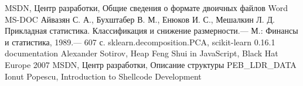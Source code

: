 \begin{thebibliography}{99}
 MSDN, Центр разработки, Общие сведения о формате двоичных файлов Word MS-DOC
 Айвазян С. А., Бухштабер В. М., Енюков И. С., Мешалкин Л. Д. Прикладная статистика. Классификация и снижение размерности.— М.: Финансы и статистика, 1989.— 607 с.
 sklearn.decomposition.PCA, scikit-learn 0.16.1 documentation
 Alexander Sotirov, Heap Feng Shui in JavaScript, Black Hat Europe 2007
 MSDN, Центр разработки, Описание структуры PEB\_LDR\_DATA
 Ionut Popescu, Introduction to Shellcode Development
\end{thebibliography}